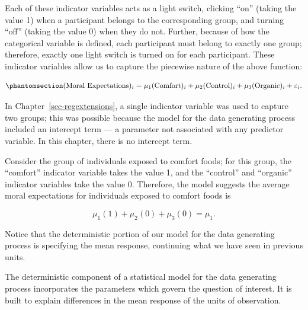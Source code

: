 \documentclass[
  letterpaper,
  DIV=11,
  numbers=noendperiod]{scrreprt}
\theoremstyle{plain}
\theoremstyle{definition}
\theoremstyle{definition}
\theoremstyle{remark}
\begin{document}
Each of these indicator variables acts as a light switch, clicking
``on'' (taking the value 1) when a participant belongs to the
corresponding group, and turning ``off'' (taking the value 0) when they
do not. Further, because of how the categorical variable is defined,
each participant must belong to exactly one group; therefore, exactly
one light switch is turned on for each participant. These indicator
variables allow us to capture the piecewise nature of the above
function:

\begin{equation}\phantomsection\label{eq-anovamodel-model}{
(\text{Moral Expectations})_i = \mu_1 (\text{Comfort})_i + \mu_2 (\text{Control})_i + \mu_3 (\text{Organic})_i + \varepsilon_i.
}\end{equation}

\begin{tcolorbox}[enhanced jigsaw, breakable, titlerule=0mm, colframe=quarto-callout-note-color-frame, bottomtitle=1mm, opacityback=0, rightrule=.15mm, toptitle=1mm, arc=.35mm, bottomrule=.15mm, left=2mm, title=\textcolor{quarto-callout-note-color}{\faInfo}\hspace{0.5em}{Note}, leftrule=.75mm, coltitle=black, toprule=.15mm, colbacktitle=quarto-callout-note-color!10!white, colback=white, opacitybacktitle=0.6]

In Chapter~\ref{sec-regextensions}, a single indicator variable was used
to capture two groups; this was possible because the model for the data
generating process included an intercept term --- a parameter not
associated with any predictor variable. In this chapter, there is no
intercept term.

\end{tcolorbox}

Consider the group of individuals exposed to comfort foods; for this
group, the ``comfort'' indicator variable takes the value 1, and the
``control'' and ``organic'' indicator variables take the value 0.
Therefore, the model suggests the average moral expectations for
individuals exposed to comfort foods is

\[\mu_1 (1) + \mu_2 (0) + \mu_3 (0) = \mu_1.\]

Notice that the deterministic portion of our model for the data
generating process is specifying the mean response, continuing what we
have seen in previous units.

\begin{tcolorbox}[enhanced jigsaw, breakable, titlerule=0mm, colframe=quarto-callout-tip-color-frame, bottomtitle=1mm, opacityback=0, rightrule=.15mm, toptitle=1mm, arc=.35mm, bottomrule=.15mm, left=2mm, title=\textcolor{quarto-callout-tip-color}{\faLightbulb}\hspace{0.5em}{Big Idea}, leftrule=.75mm, coltitle=black, toprule=.15mm, colbacktitle=quarto-callout-tip-color!10!white, colback=white, opacitybacktitle=0.6]

The deterministic component of a statistical model for the data
generating process incorporates the parameters which govern the question
of interest. It is built to explain differences in the mean response of
the units of observation.

\end{tcolorbox}
\end{document}
